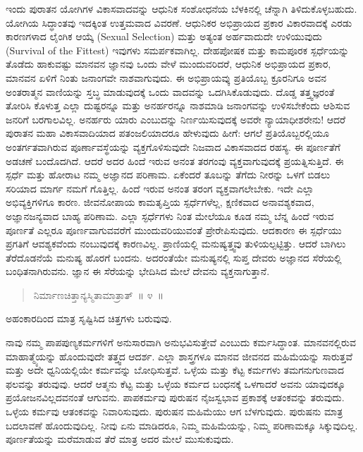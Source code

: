 ಇಂದು ಪುರಾತನ ಯೋಗಿಗಳ ವಿಕಾಸವಾದವನ್ನು ಆಧುನಿಕ ಸಂಶೋಧನೆಯ ಬೆಳಕಿನಲ್ಲಿ ಚೆನ್ನಾಗಿ ತಿಳಿದುಕೊಳ್ಳಬಹುದು. ಯೋಗಿಯ ಸಿದ್ಧಾಂತವು ಇದಕ್ಕಿಂತ ಉತ್ತಮವಾದ ವಿವರಣೆ. ಆಧುನಿಕರ ಅಭಿಪ್ರಾಯದ ಪ್ರಕಾರ ವಿಕಾರವಾದಕ್ಕೆ ಎರಡು ಕಾರಣಗಳಾದ ಲೈಂಗಿಕ ಆಯ್ಕೆ (Sexual Selection) ಮತ್ತು ಅತ್ಯಂತ ಅರ್ಹವಾದುದೇ ಉಳಿಯುವುದು (Survival of the Fittest) ಇವುಗಳು ಸಮರ್ಪಕವಾಗಿಲ್ಲ. ದೇಹಪೋಷಕ ಮತ್ತು ಕಾಮಪೂರಕ ಸ್ಪರ್ಧೆಯನ್ನು ತೊಡೆದು ಹಾಕುವಷ್ಟು ಮಾನವನ ಜ್ಞಾನವು ಒಂದು ವೇಳೆ ಮುಂದುವರಿದರೆ, ಆಧುನಿಕ ಅಭಿಪ್ರಾಯದ ಪ್ರಕಾರ, ಮಾನವನ ಏಳಿಗೆ ನಿಂತು ಜನಾಂಗವೇ ನಾಶವಾಗುವುದು. ಈ ಅಭಿಪ್ರಾಯವ್ಕು ಪ್ರತಿಯೊಬ್ಬ ಕ್ರೂರನಿಗೂ ಅವನ ಅಂತರಾತ್ಮನ ವಾಣಿಯನ್ನು ಸ್ತಬ್ಧ ಮಾಡುವುದಕ್ಕೆ ಒಂದು ವಾದವನ್ನು ಒದಗಿಸಿಕೊಡುವುದು. ದೊಡ್ಡ ತತ್ತ್ವಜ್ಞರಂತೆ ತೋರಿಸಿ ಕೊಳುತ್ತ ಎಲ್ಲಾ ದುಷ್ಟರನ್ನೂ ಮತ್ತು ಅನರ್ಹರನ್ನೂ ನಾಶಮಾಡಿ ಜನಾಂಗವನ್ನು ಉಳಿಸಬೇಕೆಂದು ಆಶಿಸುವ ಜನರಿಗೆ ಬರಗಾಲವಿಲ್ಲ. ಅನರ್ಹರು ಯಾರು ಎಂಬುದನ್ನು ನಿರ್ಣಯಿಸುವುದಕ್ಕೆ ಅವರೇ ನ್ಯಾಯಾಧೀಶರೇನು! ಆದರೆ ಪುರಾತನ ಮಹಾ ವಿಕಾಸವಾದಿಯಾದ ಪತಂಜಲಿಯಾದರೂ ಹೇಳುವುದು ಹೀಗೆ: ಆಗಲೆ ಪ್ರತಿಯೊಬ್ಬರಲ್ಲಿಯೂ ಅಂತರ್ಗತವಾಗಿರುವ ಪೂರ್ಣಾವಸ್ಥೆಯನ್ನು ವ್ಯಕ್ತಗೊಳಿಸುವುದೇ ನಿಜವಾದ ವಿಕಾಸವಾದದ ರಹಸ್ಯ. ಈ ಪೂರ್ಣತೆಗೆ ಅಡಚಣೆ ಬಂದೊದಗಿದೆ. ಆದರೆ ಅದರ ಹಿಂದೆ ಇರುವ ಅನಂತ ತರಗಂವು ವ್ಯಕ್ತವಾಗುವುದಕ್ಕೆ ಪ್ರಯತ್ನಿಸುತ್ತಿದೆ. ಈ ಸ್ಪರ್ಧೆ ಮತ್ತು ಹೋರಾಟ ನಮ್ಮ ಅಜ್ಞಾನದ ಪರಿಣಾಮ. ಏಕೆಂದರೆ ತೂಬನ್ನು ತೆಗೆದು ನೀರನ್ನು ಒಳಗೆ ಬಿಡಲು ಸರಿಯಾದ ಮಾರ್ಗ ನಮಗೆ ಗೊತ್ತಿಲ್ಲ. ಹಿಂದೆ ಇರುವ ಅನಂತ ತರಂಗ ವ್ಯಕ್ತವಾಗಲೇಬೇಕು. ಇದೇ ಎಲ್ಲಾ ಅಭಿವ್ಯಕ್ತಿಗಳಿಗೂ ಕಾರಣ. ಜೀವನೋಪಾಯ ಕಾಮತೃಪ್ತಿಯ ಸ್ಪರ್ಧೆಗಳೆಲ್ಲ, ಕ್ಷಣಿಕವಾದ ಅನಾವಶ್ಯಕವಾದ, ಅಜ್ಞಾನಜನ್ಯವಾದ ಬಾಹ್ಯ ಪರಿಣಾಮ. ಎಲ್ಲಾ ಸ್ಫರ್ಧೆಗಳು ನಿಂತ ಮೇಲೆಯೂ ಕೂಡ ನಮ್ಮ ಬೆನ್ನ ಹಿಂದೆ ಇರುವ ಪೂರ್ಣತೆ ಎಲ್ಲರೂ ಪೂರ್ಣವಾಗುವವರೆಗೆ ಮುಂದುವರಿಯುವಂತೆ ಪ್ರೇರೇಪಿಸುವುದು. ಆದಕಾರಣ ಈ ಸ್ಪರ್ಧೆಯು ಪ್ರಗತಿಗೆ ಆವಶ್ಯಕವೆಂದು ನಂಬುವುದಕ್ಕೆ ಕಾರಣವಿಲ್ಲ. ಪ್ರಾಣಿಯಲ್ಲಿ ಮನುಷ್ಯತ್ತ್ವವು ತುಳಿಯಲ್ಪಟ್ಟಿತ್ತು. ಆದರೆ ಬಾಗಿಲು ತೆರೆದೊಡನೆಯೆ ಮನುಷ್ಯ ಹೊರಗೆ ಬಂದನು. ಅದರಂತೆಯೇ ಮನುಷ್ಯನಲ್ಲಿ ಸುಪ್ತ ದೇವರು ಅಜ್ಞಾನದ ಸೆರೆಯಲ್ಲಿ ಬಂಧಿತನಾಗಿರುವನು. ಜ್ಞಾನ ಈ ಸೆರೆಯನ್ನು ಭೇದಿಸಿದ ಮೇಲೆ ದೇವನು ವ್ಯಕ್ತನಾಗುತ್ತಾನೆ. 

\vspace{-0.3cm}

\begin{verse}
ನಿರ್ಮಾಣಚಿತ್ತಾನ್ಯಸ್ಮಿತಾಮಾತ್ರಾತ್​~॥ ೪~॥
\end{verse}

\vspace{-0.3cm}

ಅಹಂಕಾರದಿಂದ ಮಾತ್ರ ಸೃಷ್ಟಿಸಿದ ಚಿತ್ತಗಳು ಬರುವುವು. 

ನಾವು ನಮ್ಮ ಪಾಪಪುಣ್ಯಕರ್ಮಗಳಿಗೆ ಅನುಸಾರವಾಗಿ ಅನುಭವಿಸುತ್ತೇವೆ ಎಂಬುದು ಕರ್ಮಸಿದ್ಧಾಂತ. ಮಾನವನಲ್ಲಿರುವ ಮಾಹಾತ್ಮ್ಯೆಯನ್ನು ಹೊಂದುವುದೇ ತತ್ತ್ವದ ಆದರ್ಶ. ಎಲ್ಲಾ ಶಾಸ್ತ್ರಗಳೂ ಮಾನವ ಜೀವನದ ಮಹಿಮೆಯನ್ನು ಸಾರುತ್ತವೆ ಮತ್ತು ಅದೇ ಧ್ವನಿಯಲ್ಲಿಯೇ ಕರ್ಮವನ್ನು ಬೋಧಿಸುತ್ತವೆ. ಒಳ್ಳೆಯ ಮತ್ತು ಕೆಟ್ಟ ಕರ್ಮಗಳು ತಮಗನುಗುಣವಾದ ಫಲವನ್ನು ತರುವುವು. ಆದರೆ ಆತ್ಮನು ಕೆಟ್ಟ ಮತ್ತು ಒಳ್ಳೆಯ ಕರ್ಮದ ಬಂಧನಕ್ಕೆ ಒಳಗಾದರೆ ಅವನು ಯಾವುದಕ್ಕೂ ಪ್ರಯೋಜನವಿಲ್ಲದವನಂತೆ ಆಗುವನು. ಪಾಪಕರ್ಮವು ಪುರುಷನ ನೈಜಸ್ವಭಾವ ಪ್ರಕಾಶಕ್ಕೆ ಆತಂಕವನ್ನು ತರುವುದು. ಒಳ್ಳೆಯ ಕರ್ಮವು ಆತಂಕವನ್ನು ನಿವಾರಿಸುವುದು. ಪುರುಷನ ಮಹಿಮೆಯು ಆಗ ಬೆಳಗುವುದು. ಪುರುಷನು ಮಾತ್ರ ಬದಲಾವಣೆ ಹೊಂದುವುದಿಲ್ಲ. ನೀವು ಏನು ಮಾಡಿದರೂ, ನಿಮ್ಮ ಮಹಿಮೆಯನ್ನು, ನಿಮ್ಮ ಪರಿಣಾಮಕ್ಕೂ ಸಿಕ್ಕುವುದಿಲ್ಲ. ಪೂರ್ಣತೆಯನ್ನು ಮರೆಮಾಡುವ ತೆರೆ ಮಾತ್ರ ಅದರ ಮೇಲೆ ಮುಸುಕುವುದು. 

